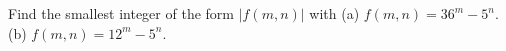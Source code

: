 Find the smallest integer of the form $|f(m, n)|$ with (a) $f(m, n) = 36^m - 5^n$. (b) $f(m, n) = 12^m - 5^n$.
